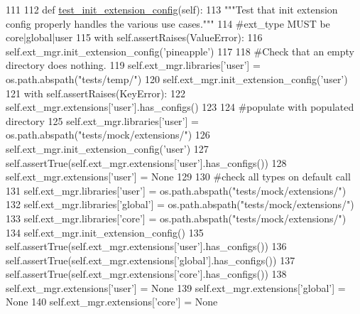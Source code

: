 \begin{DoxyCode}
111 
112     \textcolor{keyword}{def }\hyperlink{classtests_1_1utils_1_1extension__manager__tests_1_1LoadConfigSettings_ad545de88fc2f5eba813161fa4cb31d83}{test\_init\_extension\_config}(self):
113         \textcolor{stringliteral}{"""Test that init extension config properly handles the various use cases."""}
114         \textcolor{comment}{#ext\_type MUST be core|global|user}
115         with self.assertRaises(ValueError):
116             self.ext\_mgr.init\_extension\_config(\textcolor{stringliteral}{'pineapple'})
117 
118         \textcolor{comment}{#Check that an empty directory does nothing.}
119         self.ext\_mgr.libraries[\textcolor{stringliteral}{'user'}] = os.path.abspath(\textcolor{stringliteral}{"tests/temp/"})
120         self.ext\_mgr.init\_extension\_config(\textcolor{stringliteral}{'user'})
121         with self.assertRaises(KeyError):
122             self.ext\_mgr.extensions[\textcolor{stringliteral}{'user'}].has\_configs()
123 
124         \textcolor{comment}{#populate with populated directory}
125         self.ext\_mgr.libraries[\textcolor{stringliteral}{'user'}] = os.path.abspath(\textcolor{stringliteral}{"tests/mock/extensions/"})
126         self.ext\_mgr.init\_extension\_config(\textcolor{stringliteral}{'user'})
127         self.assertTrue(self.ext\_mgr.extensions[\textcolor{stringliteral}{'user'}].has\_configs())
128         self.ext\_mgr.extensions[\textcolor{stringliteral}{'user'}] = \textcolor{keywordtype}{None}
129         
130         \textcolor{comment}{#check all types on default call}
131         self.ext\_mgr.libraries[\textcolor{stringliteral}{'user'}] = os.path.abspath(\textcolor{stringliteral}{"tests/mock/extensions/"})
132         self.ext\_mgr.libraries[\textcolor{stringliteral}{'global'}] = os.path.abspath(\textcolor{stringliteral}{"tests/mock/extensions/"})
133         self.ext\_mgr.libraries[\textcolor{stringliteral}{'core'}] = os.path.abspath(\textcolor{stringliteral}{"tests/mock/extensions/"})
134         self.ext\_mgr.init\_extension\_config()
135         self.assertTrue(self.ext\_mgr.extensions[\textcolor{stringliteral}{'user'}].has\_configs())
136         self.assertTrue(self.ext\_mgr.extensions[\textcolor{stringliteral}{'global'}].has\_configs())
137         self.assertTrue(self.ext\_mgr.extensions[\textcolor{stringliteral}{'core'}].has\_configs())
138         self.ext\_mgr.extensions[\textcolor{stringliteral}{'user'}] = \textcolor{keywordtype}{None}
139         self.ext\_mgr.extensions[\textcolor{stringliteral}{'global'}] = \textcolor{keywordtype}{None}
140         self.ext\_mgr.extensions[\textcolor{stringliteral}{'core'}] = \textcolor{keywordtype}{None}        
        
\end{DoxyCode}
